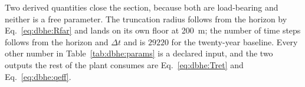 Two derived quantities close the section, because both are load-bearing and
neither is a free parameter. The truncation radius follows from the horizon by
Eq.~\eqref{eq:dbhe:Rfar} and lands on its own floor at \SI{200}{\metre}; the
number of time steps follows from the horizon and $\Delta t$ and is
$\num{29220}$ for the twenty-year baseline. Every other number in
Table~\ref{tab:dbhe:params} is a declared input, and the two outputs the rest of
the plant consumes are Eq.~\eqref{eq:dbhe:Tret} and Eq.~\eqref{eq:dbhe:qeff}.
